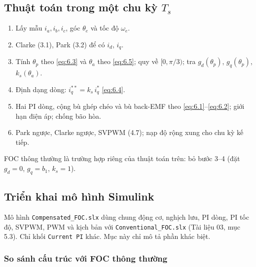 \subsection{\texorpdfstring{Thuật toán trong một chu kỳ $T_s$}{Thuật toán trong một chu kỳ Ts}}\label{sec:6.6}

\begin{enumerate}[leftmargin=*]
\item Lấy mẫu $i_a, i_b, i_c$, góc $\theta_e$ và tốc độ $\omega_e$.
\item Clarke (3.1), Park (3.2) để có $i_d$, $i_q$.
\item Tính $\theta_p$ theo \eqref{eq:6.3} và $\theta_a$ theo \eqref{eq:6.5}; quy về $[0,\pi/3)$; tra $g_d(\theta_p)$, $g_q(\theta_p)$, $k_s(\theta_a)$.
\item Định dạng dòng: $i_q^{**} = k_s\, i_q^*$ \eqref{eq:6.4}.
\item Hai PI dòng, cộng bù ghép chéo và bù back-EMF theo \eqref{eq:6.1}–\eqref{eq:6.2}; giới hạn điện áp; chống bão hòa.
\item Park ngược, Clarke ngược, SVPWM (4.7); nạp độ rộng xung cho chu kỳ kế tiếp.
\end{enumerate}

FOC thông thường là trường hợp riêng của thuật toán trên: bỏ bước 3–4 (đặt $g_d = 0$, $g_q = b_1$, $k_s = 1$).

\subsection{Triển khai mô hình Simulink}\label{sec:6.7}

Mô hình \texttt{Compensated\_FOC.slx} dùng chung động cơ, nghịch lưu, PI dòng, PI tốc độ, SVPWM, PWM và kịch bản với \texttt{Conventional\_FOC.slx} (Tài liệu 03, mục 5.3). Chỉ khối \texttt{Current PI} khác. Mục này chỉ mô tả phần khác biệt.

\subsubsection{So sánh cấu trúc với FOC thông thường}\label{sec:6.7.1}

